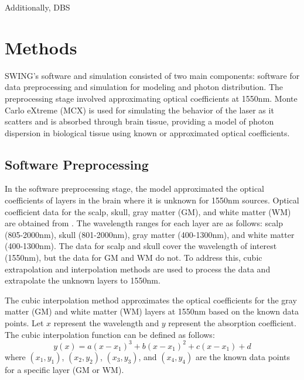 \documentclass[journal,twoside,web]{ieeecolor}
\begin{document}
Additionally, DBS


\section{Methods}
\label{sec:methods}
SWING's software and simulation consisted of two main components: software for data preprocessing and simulation for modeling and photon distribution. 
The preprocessing stage involved approximating optical coefficients at 1550nm. Monte Carlo eXtreme (MCX) \cite{b6} is used for simulating the 
behavior of the laser as it scatters and is absorbed through brain tissue, providing a model of photon dispersion in biological tissue using known or 
approximated optical coefficients.

\subsection{Software Preprocessing}
In the software preprocessing stage, the model approximated the optical coefficients of layers in the brain where it is unknown for 1550nm sources. 
Optical coefficient data for the scalp, skull, gray matter (GM), and white matter (WM) are obtained from \cite{b5}. The wavelength ranges for each layer are as follows: 
scalp (805-2000nm), skull (801-2000nm), gray matter (400-1300nm), and white matter (400-1300nm). The data for scalp and skull cover the wavelength of interest 
(1550nm), but the data for GM and WM do not. To address this, cubic extrapolation and interpolation methods are used to process the data and extrapolate the 
unknown layers to 1550nm. 

The cubic interpolation method approximates the optical coefficients for the gray matter (GM) and white matter (WM) layers at 1550nm based on the 
known data points. Let $x$ represent the wavelength and $y$ represent the absorption coefficient. The cubic interpolation function can be defined as follows:
\begin{equation}
    \label{eq:cubicEq1}
    y(x) = a(x-x_1)^3 + b(x-x_1)^2 + c(x-x_1) + d
\end{equation}
where $(x_1, y_1)$, $(x_2, y_2)$, $(x_3, y_3)$, and $(x_4, y_4)$ are the known data points for a specific layer (GM or WM).
\end{document}
